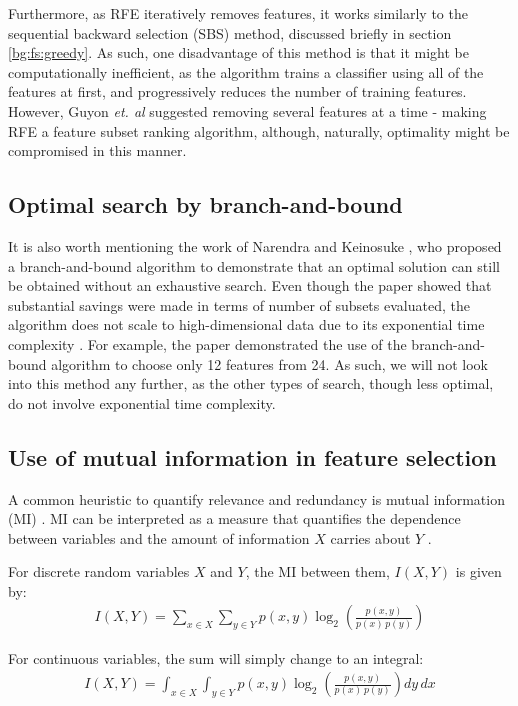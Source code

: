 \documentclass[12pt, twoside, a4paper]{report}
\begin{document}
Furthermore, as RFE iteratively removes features, it works similarly to the sequential backward selection (SBS) method, discussed briefly in section \ref{bg:fs:greedy}. As such, one disadvantage of this method is that it might be computationally inefficient, as the algorithm trains a classifier using all of the features at first, and progressively reduces the number of training features. However, Guyon \textit{et. al} suggested removing several features at a time - making RFE a feature subset ranking algorithm, although, naturally, optimality might be compromised in this manner.


\subsection{Optimal search by branch-and-bound}
It is also worth mentioning the work of Narendra and Keinosuke \cite{RefWorks:176}, who proposed a branch-and-bound algorithm to demonstrate that an optimal solution can still be obtained without an exhaustive search. Even though the paper showed that substantial savings were made in terms of number of subsets evaluated, the algorithm does not scale to high-dimensional data \cite{RefWorks:178} due to its exponential time complexity \cite{RefWorks:190, RefWorks:189}. For example, the paper demonstrated the use of the branch-and-bound algorithm to choose only 12 features from 24. As such, we will not look into this method any further, as the other types of search, though less optimal, do not involve exponential time complexity.

\subsection{Use of mutual information in feature selection} \label{bg:fs:mi}

A common heuristic to quantify relevance and redundancy is mutual information (MI) \cite{RefWorks:98}. MI can be interpreted as a measure that quantifies the dependence between variables \cite{RefWorks:180} and the amount of information $X$ carries about $Y$ \cite{RefWorks:181}. 

For discrete random variables $X$ and $Y$, the MI between them, $I(X, Y)$ is given by:
\begin{align} \label{bg:fs:mi:dis}
I(X, Y) = \sum_{x \in X} \sum_{y \in Y} p(x, y) \log_2 \left(\frac{p(x, y)}{p(x) \, p(y)} \right) 
\end{align}

For continuous variables, the sum will simply change to an integral:
\begin{align} \label{bg:fs:mi:cont}
I(X, Y) = \int_{x \in X} \int_{y \in Y} p(x, y) \log_2 \left( \frac{p(x, y)}{p(x) \, p(y)} \right) dy \, dx
\end{align}
\end{document}
